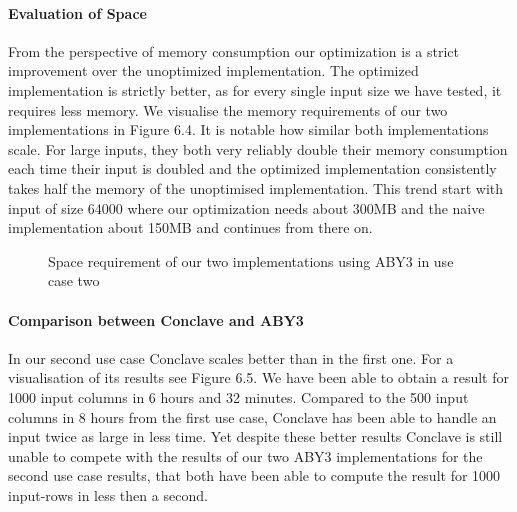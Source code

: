 \paragraph{Evaluation of Space}
From the perspective of memory consumption our optimization is a strict improvement over the unoptimized implementation.
The optimized implementation is strictly better, as for every single input size we have tested, it requires less memory. We visualise the memory requirements of our two implementations in Figure 6.4.
It is notable how similar both implementations scale. For large inputs, they both very reliably double their memory consumption each time their input is doubled and the optimized implementation consistently takes half the memory of the unoptimised implementation. This trend start with input of size 64000 where our optimization needs about 300MB and the naive implementation about 150MB and continues from there on.
\begin{figure}[H]
	\caption{Space requirement of our two implementations using ABY3 in use case two}
\end{figure}
\paragraph{Comparison between Conclave and ABY3}
In our second use case Conclave scales better than in the first one. For a visualisation of its results see Figure 6.5. We have been able to obtain a result for 1000 input columns in 6 hours and 32 minutes. Compared to the 500 input columns in 8 hours from the first use case, Conclave has been able to handle an input twice as large in less time. Yet despite these better results Conclave is still unable to compete with the results of our two ABY3 implementations for the second use case results, that both have been able to compute the result for 1000 input-rows in less then a second.

